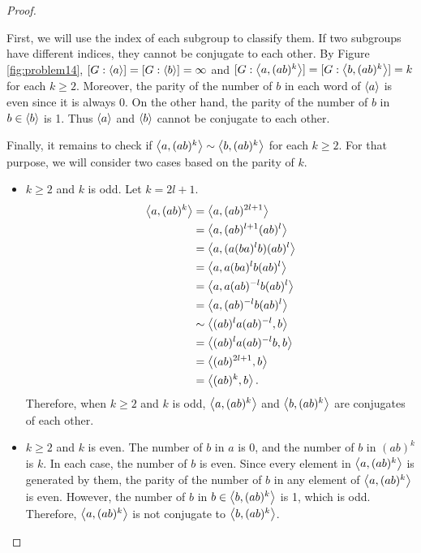 \documentclass[12pt, psamsfonts]{amsart}
\theoremstyle{definition}
\theoremstyle{remark}
\numberwithin{equation}{section}
\begin{document}
\begin{proof}
\begin{itemize}
      First, we will use the index of each subgroup to classify them.
      If two subgroups have different indices, they cannot be conjugate to each other.
      By Figure \ref{fig:problem14}, $[G: \ev{a}] = [G: \ev{b}] = \infty$ and $[G: \ev{a, (ab)^k}] = [G: \ev{b, (ab)^k}] = k$ for each $k \geq 2$.
      Moreover, the parity of the number of $b$ in each word of $\ev{a}$ is even since it is always 0.
      On the other hand, the parity of the number of $b$ in $b \in \ev{b}$ is 1.
      Thus $\ev{a}$ and $\ev{b}$ cannot be conjugate to each other.

      Finally, it remains to check if $\ev{a, (ab)^k} \sim \ev{b, (ab)^k}$ for each $k \geq 2$.
      For that purpose, we will consider two cases based on the parity of $k$.
      \begin{itemize}
        \item
          $k \geq 2$ and $k$ is odd.
          Let $k = 2l + 1$.
          \begin{align*}
            \ev{a, (ab)^k}
              &= \ev{a, (ab)^{2l + 1}} \\
              &= \ev{a, (ab)^{l + 1}(ab)^l} \\
              &= \ev{a, (a(ba)^lb)(ab)^l} \\
              &= \ev{a, a(ba)^lb(ab)^l} \\
              &= \ev{a, a(ab)^{-l}b(ab)^l} \\
              &= \ev{a, (ab)^{-l}b(ab)^l} \\
              &\sim \ev{(ab)^la(ab)^{-l}, b} \\
              &= \ev{(ab)^la(ab)^{-l}b, b} \\
              &= \ev{(ab)^{2l + 1}, b} \\
              &= \ev{(ab)^{k}, b}.
          \end{align*}
          Therefore, when $k \geq 2$ and $k$ is odd, $\ev{a, (ab)^k}$ and $\ev{b, (ab)^k}$ are conjugates of each other.
        \item
          $k \geq 2$ and $k$ is even.
          The number of $b$ in $a$ is 0, and the number of $b$ in $(ab)^k$ is $k$.
          In each case, the number of $b$ is even.
          Since every element in $\ev{a, (ab)^k}$ is generated by them, the parity of the number of $b$ in any element of $\ev{a, (ab)^k}$ is even.
          However, the number of $b$ in $b \in \ev{b, (ab)^k}$ is 1, which is odd.
          Therefore, $\ev{a, (ab)^k}$ is not conjugate to $\ev{b, (ab)^k}$.
      \end{itemize}

\end{itemize}
\end{proof}
\end{document}
